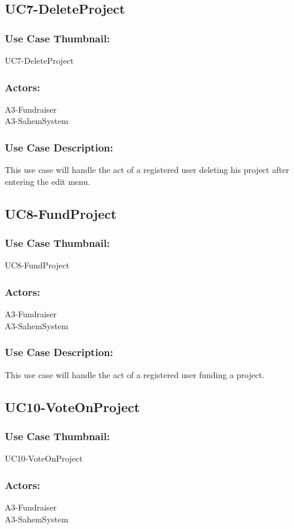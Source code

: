 \documentclass[11pt, openany]{report}
\begin{document}
\subsection{UC7-DeleteProject}
\label{sUC7}
\subsubsection*{Use Case Thumbnail:}
UC7-DeleteProject
\subsubsection*{Actors:}
A3-Fundraiser\\
A3-SahemSystem

\subsubsection*{Use Case Description:}
This use case will handle the act of a registered user deleting his project after entering the edit menu.

\subsection{UC8-FundProject}
\label{sUC8}
\subsubsection*{Use Case Thumbnail:}
UC8-FundProject
\subsubsection*{Actors:}
A3-Fundraiser\\
A3-SahemSystem

\subsubsection*{Use Case Description:}
This use case will handle the act of a registered user funding a project.

\subsection{UC10-VoteOnProject}
\label{sUC10}
\subsubsection*{Use Case Thumbnail:}
UC10-VoteOnProject
\subsubsection*{Actors:}
A3-Fundraiser\\
A3-SahemSystem
\end{document}
